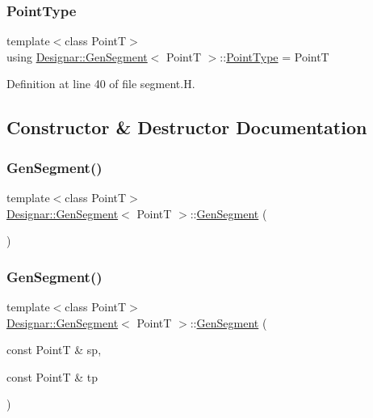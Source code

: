 \subsubsection{\texorpdfstring{Point\+Type}{PointType}}
{\footnotesize\ttfamily template$<$class PointT$>$ \\
using \hyperlink{class_designar_1_1_gen_segment}{Designar\+::\+Gen\+Segment}$<$ PointT $>$\+::\hyperlink{class_designar_1_1_gen_segment_a411a0e6d28251be878c23ad4dbec71bb}{Point\+Type} =  PointT}



Definition at line 40 of file segment.\+H.



\subsection{Constructor \& Destructor Documentation}
\mbox{\label{class_designar_1_1_gen_segment_ab57969fe5adbc572d437709946c0999d}} 
\subsubsection{\texorpdfstring{Gen\+Segment()}{GenSegment()}\hspace{0.1cm}{\footnotesize\ttfamily [1/7]}}
{\footnotesize\ttfamily template$<$class PointT$>$ \\
\hyperlink{class_designar_1_1_gen_segment}{Designar\+::\+Gen\+Segment}$<$ PointT $>$\+::\hyperlink{class_designar_1_1_gen_segment}{Gen\+Segment} (\begin{DoxyParamCaption}{ }\end{DoxyParamCaption})\hspace{0.3cm}{\ttfamily [default]}}

\mbox{\label{class_designar_1_1_gen_segment_a3735dbb7660ebba6d82a977eaee42ed8}} 
\subsubsection{\texorpdfstring{Gen\+Segment()}{GenSegment()}\hspace{0.1cm}{\footnotesize\ttfamily [2/7]}}
{\footnotesize\ttfamily template$<$class PointT$>$ \\
\hyperlink{class_designar_1_1_gen_segment}{Designar\+::\+Gen\+Segment}$<$ PointT $>$\+::\hyperlink{class_designar_1_1_gen_segment}{Gen\+Segment} (\begin{DoxyParamCaption}\item[{const PointT \&}]{sp,  }\item[{const PointT \&}]{tp }\end{DoxyParamCaption})\hspace{0.3cm}{\ttfamily [inline]}}



